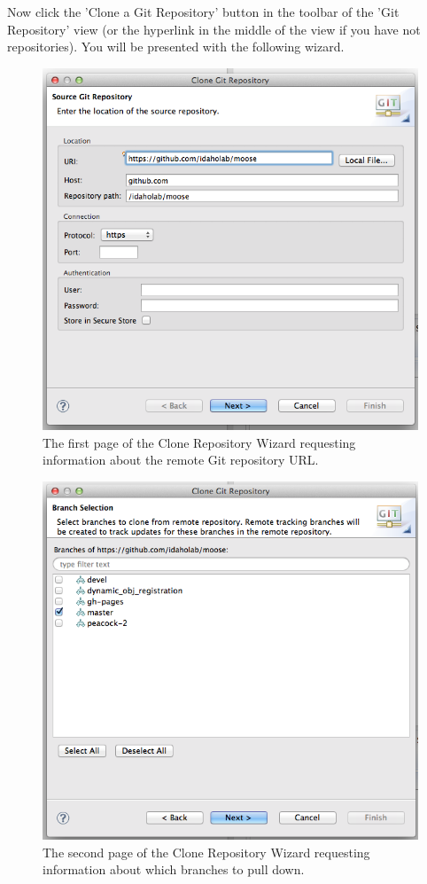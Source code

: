 Now click the 'Clone a Git Repository' button in the toolbar of the 'Git
Repository' view (or the hyperlink in the middle of the view if you have
not repositories). You will be presented with the following wizard.

\begin{figure}[htbp]
\centering
\includegraphics[width=\textwidth]{figures/clone_wizard.png}
\caption{The first page of the Clone Repository Wizard requesting information about the remote Git repository URL.}
\end{figure}
\begin{figure}[htbp]
\centering
\includegraphics[width=\textwidth]{figures/clone_wizard2.png}
\caption{The second page of the Clone Repository Wizard requesting information about which branches to pull down.}
\end{figure}
